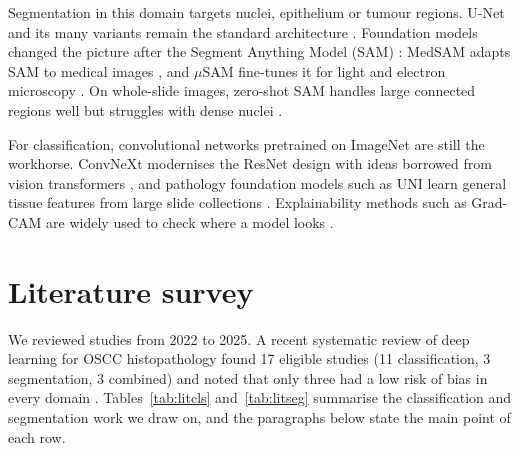 \documentclass[10pt,twocolumn]{article}
\begin{document}
Segmentation in this domain targets nuclei, epithelium or tumour regions. U-Net and its many variants remain the standard architecture \citep{azad2024}. Foundation models changed the picture after the Segment Anything Model (SAM) \citep{kirillov2023}: MedSAM adapts SAM to medical images \citep{ma2024}, and $\mu$SAM fine-tunes it for light and electron microscopy \citep{archit2025}. On whole-slide images, zero-shot SAM handles large connected regions well but struggles with dense nuclei \citep{deng2025}.

For classification, convolutional networks pretrained on ImageNet are still the workhorse. ConvNeXt modernises the ResNet design with ideas borrowed from vision transformers \citep{liu2022}, and pathology foundation models such as UNI learn general tissue features from large slide collections \citep{chen2024}. Explainability methods such as Grad-CAM are widely used to check where a model looks \citep{vandervelden2022}.

\section{Literature survey}

We reviewed studies from 2022 to 2025. A recent systematic review of deep learning for OSCC histopathology found 17 eligible studies (11 classification, 3 segmentation, 3 combined) and noted that only three had a low risk of bias in every domain \citep{pirayesh2024}. Tables~\ref{tab:litcls} and~\ref{tab:litseg} summarise the classification and segmentation work we draw on, and the paragraphs below state the main point of each row.
\end{document}
